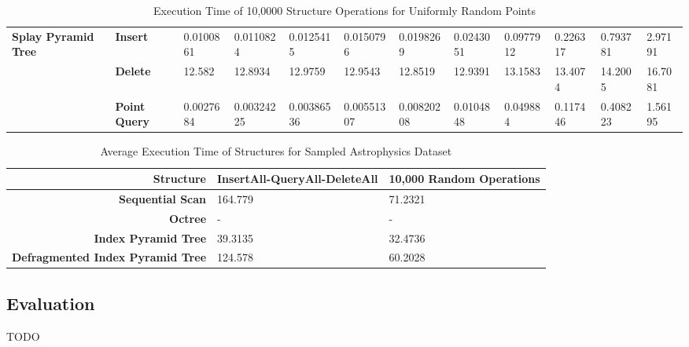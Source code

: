 \begin{landscape}
\begin{table}
\begin{tabular}{|p{2cm}|l|l|l|l|l|l|l|l|l|l|l|}
			\hline
			\multirow{ 4}{*}{\textbf{Splay Pyramid Tree}} & \textbf{Insert} & 0.0100861 & 0.0110824 & 0.0125415 & 0.0150796 & 0.0198269 & 0.0243051 & 0.0977912 & 0.226317 & 0.793781 & 2.97191 \\
			 & \textbf{Delete} & 12.582 & 12.8934 & 12.9759 & 12.9543 & 12.8519 & 12.9391 & 13.1583 & 13.4074 & 14.2005 & 16.7081 \\
			 & \textbf{Point Query} & 0.0027684 & 0.00324225 & 0.00386536 & 0.00551307 & 0.00820208 & 0.0104848 & 0.049884 & 0.117446 & 0.408223 & 1.56195 \\
			\hline
		\end{tabular}
		\caption{Execution Time of 10,0000 Structure Operations for Uniformly Random Points}
		\label{tab:perf2-randuniform}
	\end{table}

	\begin{table}
		\centering
		\begin{tabular}{|r|l|l|}
			\hline
			\textbf{Structure} & \textbf{InsertAll-QueryAll-DeleteAll} & \textbf{10,000 Random Operations} \\
			\hline
			\textbf{Sequential Scan} & 164.779 & 71.2321 \\
			\textbf{Octree} & - & - \\
			\textbf{Index Pyramid Tree} & 39.3135 & 32.4736 \\
			\textbf{Defragmented Index Pyramid Tree} & 124.578 & 60.2028 \\
			\hline
		\end{tabular}
		\caption{Average Execution Time of Structures for Sampled Astrophysics Dataset}
		\label{tab:perf2-astrophysics}
	\end{table}

\end{landscape}

\subsection{Evaluation}

TODO
